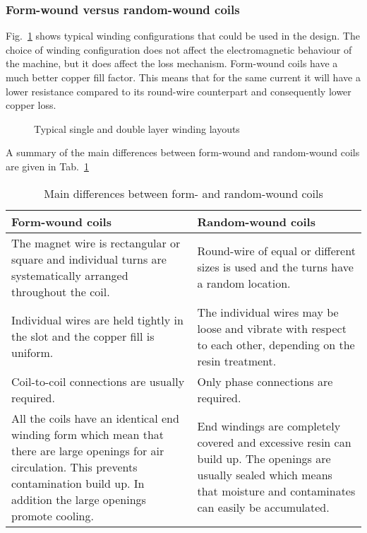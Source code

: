 \subsubsection{Form-wound versus random-wound coils}
Fig.~\ref{fig:insulation} shows typical winding configurations that could be used in the design. The choice of winding configuration does not affect the electromagnetic behaviour of the machine, but it does affect the loss mechanism. Form-wound coils have a much better copper fill factor. This means that for the same current it will have a lower resistance compared to its round-wire counterpart and consequently lower copper loss.   
\begin{figure}[htbp]
	\centering
	
	\caption{Typical single and double layer winding layouts}	
	\label{fig:insulation}
\end{figure}
A summary of the main differences between form-wound and random-wound coils are given in Tab.~\ref{tab:form_vs_round}
\begin{table}
\caption{Main differences between form- and random-wound coils}
\label{tab:form_vs_round}
\begin{tabularx}{\textwidth}{XX}
\toprule
\textbf{Form-wound coils}  & \textbf{Random-wound coils} \\\toprule
The magnet wire is rectangular or square and individual turns are systematically arranged throughout the coil. & 
Round-wire of equal or different sizes is used and the turns have a random location.\\\midrule
Individual wires are held tightly in the slot and the copper fill is uniform. &
The individual wires may be loose and vibrate with respect to each other, depending on the resin treatment.\\\midrule
Coil-to-coil connections are usually required. &
Only phase connections are required. \\\midrule
All the coils have an identical end winding form which mean that there are large openings for air circulation. This prevents contamination build up. In addition the large openings promote cooling.&
End windings are completely covered and excessive resin can build up. The openings are usually sealed which means that moisture and contaminates can easily be accumulated.  
\\\bottomrule
\end{tabularx}
\end{table}

